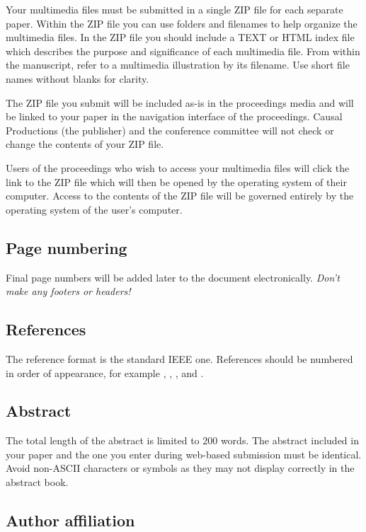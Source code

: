 \documentclass[a4paper]{article}
\begin{document}
Your multimedia files must be submitted in a single ZIP file for each separate paper. Within the ZIP file you can use folders and filenames to help organize the multimedia files. In the ZIP file you should include a TEXT or HTML index file which describes the purpose and significance of each multimedia file. From within the manuscript, refer to a multimedia illustration by its filename. Use short file names without blanks for clarity.

The ZIP file you submit will be included as-is in the proceedings media and will be linked to your paper in the navigation interface of the proceedings. Causal Productions (the publisher) and the conference committee will not check or change the contents of your ZIP file.

Users of the proceedings who wish to access your multimedia files will click the link to the ZIP file which will then be opened by the operating system of their computer. Access to the contents of the ZIP file will be governed entirely by the operating system of the user's computer.

\subsection{Page numbering}

Final page numbers will be added later to the document electronically. \emph{Don't make any footers or headers!}


\subsection{References}

The reference format is the standard IEEE one. References should be numbered in order of appearance, for example \cite{Davis80-COP}, \cite{Rabiner89-ATO}, \cite[pp.\ 417--422]{Hastie09-TEO}, and \cite{YourName17-XXX}.

\subsection{Abstract}

The total length of the abstract is limited to 200 words. The abstract included in your paper and the one you enter during web-based submission must be identical. Avoid non-ASCII characters or symbols as they may not display correctly in the abstract book.

\subsection{Author affiliation}
\end{document}
